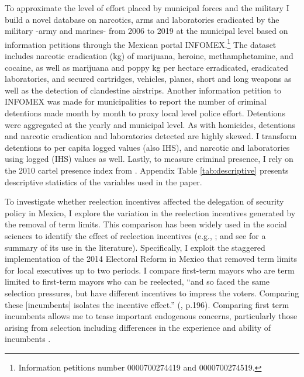 \documentclass[12pt]{amsart}
\makeatletter
\def\section{\@startsection{section}{1}
	\z@{1.0\linespacing\@plus\linespacing}{.5\linespacing}{\Large}}
\numberwithin{equation}{section}
\theoremstyle{definition}
\theoremstyle{definition}
\theoremstyle{definition}
\makeatother
\begin{document}
To approximate the level of effort placed by municipal forces and the military I build a novel database on narcotics, arms and laboratories eradicated by the military -army and marines- from 2006 to 2019 at the municipal level  based on information petitions through the Mexican portal INFOMEX.\footnote{Information petitions number 0000700274419 and 0000700274519.} The dataset includes narcotic eradication (kg) of marijuana, heroine, methamphetamine, and cocaine, as well as marijuana and poppy kg per hectare erradicated, eradicated laboratories, and secured cartridges, vehicles, planes, short and long weapons as well as the detection of clandestine airstrips. %
Another information petition to INFOMEX was made for municipalities to report the number of criminal detentions made month by month to proxy local level police effort. Detentions were aggregated at the yearly and municipal level. As with homicides, detentions and narcotic eradication and laboratories detected are highly skewed. I transform detentions to per capita logged values (also IHS), and narcotic and laboratories using logged (IHS) values as well. Lastly, to measure criminal presence, I rely on the 2010 cartel presence index from \citet{camilo_etal_2018}. 
 Appendix Table \ref{tab:descriptive} presents descriptive statistics of the variables used in the paper.

\section{Research Design \label{sec:design}}  

To investigate whether reelection incentives affected the delegation of security policy in Mexico, I explore the variation in the reelection incentives generated by the removal of term limits. This comparison has been widely used in the social sciences to identify the effect of reelection incentives (e.g., \citet{Besley_case_1995}; and see \citet{ashworth_2012} for a summary of its use in the literature). Specifically, I exploit the staggered implementation of the 2014 Electoral Reform in Mexico that removed term limits for local executives up to two periods. I compare first-term mayors who are term limited to first-term mayors who can be reelected, ``and so faced the same selection pressures, but have different incentives to impress the voters. Comparing these [incumbents] isolates the incentive effect.'' (\citet{ashworth_2012}, p.196). Comparing first term incumbents allows me to tease important endogenous concerns, particularly those arising from selection including differences in the experience and ability of incumbents \citep{ferraz_finan_2011}. 
   
\end{document}
